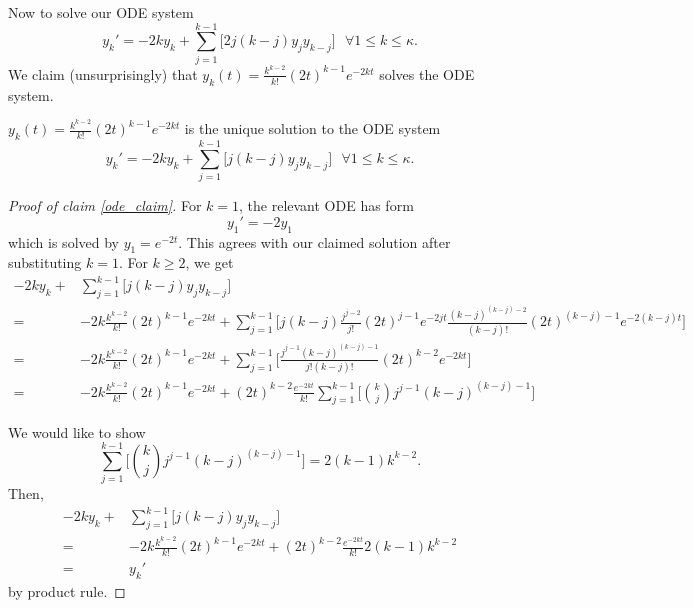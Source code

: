 Now to solve our ODE system
\[y_{k}' = -2 k y_{k} + \sum\limits_{j=1}^{k-1} \Big[ 2 j (k - j) y_{j}y_{k-j}\Big] \text{ } \forall 1 \leq k \leq \kappa. \]
We claim (unsurprisingly) that \(y_{k}(t) = \frac{k^{k-2}}{k!}(2t)^{k-1} e^{-2kt}\) solves the ODE system.
\begin{claim} 
    \label{ode_claim}
    \(y_{k}(t) = \frac{k^{k-2}}{k!}(2t)^{k-1} e^{-2kt}\) is the unique solution to the ODE system
    \[y_{k}' = -2 k y_{k} + \sum\limits_{j=1}^{k-1} \Big[ j (k - j) y_{j}y_{k-j}\Big] \text{ } \forall 1 \leq k \leq \kappa. \]
\end{claim}
\begin{proof}[Proof of claim \ref{ode_claim}]
    For \(k = 1\), the relevant ODE has form
    \[y_{1}' = -2 y_{1}\]
    which is solved by \(y_{1} = e^{-2t}\). This agrees with our claimed solution after substituting \(k=1\). For \(k \geq 2\), we get
    \begin{align*}
        -2 k y_{k} + &\sum\limits_{j=1}^{k-1} \Big[ j (k - j) y_{j}y_{k-j}\Big] \\
        = &-2 k \frac{k^{k-2}}{k!}(2t)^{k-1} e^{-2kt} + \sum\limits_{j=1}^{k-1} \Big[ j (k - j) \frac{j^{j-2}}{j!}(2t)^{j-1} e^{-2jt} \frac{(k-j)^{(k-j)-2}}{(k-j)!}(2t)^{(k-j)-1} e^{-2(k-j)t}\Big] \\
        = &-2 k \frac{k^{k-2}}{k!}(2t)^{k-1} e^{-2kt} + \sum\limits_{j=1}^{k-1} \Big[  \frac{j^{j-1}(k-j)^{(k-j)-1} }{j!(k-j)!}(2t)^{k-2} e^{-2kt}\Big] \\
        = &-2 k \frac{k^{k-2}}{k!}(2t)^{k-1} e^{-2kt} + (2t)^{k-2} \frac{e^{-2kt}}{k!} \sum\limits_{j=1}^{k-1} \Big[ \binom{k}{j} j^{j-1}(k-j)^{(k-j)-1}\Big]
    \end{align*}

    We would like to show
    \[\sum\limits_{j=1}^{k-1} \Big[ \binom{k}{j} j^{j-1}(k-j)^{(k-j)-1}\Big] = 2(k-1)k^{k-2}.\]
    Then,
    \begin{align*}
        -2 k y_{k} + &\sum\limits_{j=1}^{k-1} \Big[ j (k - j) y_{j}y_{k-j}\Big] \\
        = &-2 k \frac{k^{k-2}}{k!}(2t)^{k-1} e^{-2kt} + (2t)^{k-2} \frac{e^{-2kt}}{k!} 2(k-1)k^{k-2} \\
        =& y_{k}'
    \end{align*}
    by product rule.


\end{proof}
